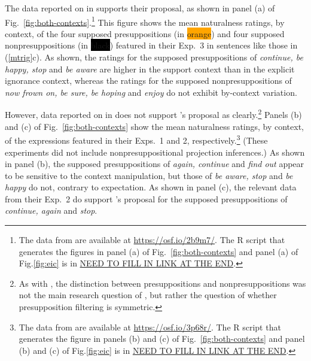 \documentclass[11pt,fleqn]{article}
\newcommand{\6}{\mbox{$[\hspace*{-.6mm}[$}}
\newcommand{\9}{\mbox{$]\hspace*{-.6mm}]$}}
\newcommand{\citepos}[1]{\citeauthor{#1}'s \citeyear{#1}}
\begin{document}
The data reported on in \citealt[Exp.~3]{mandelkern-etal2020} supports their proposal, as shown in panel (a) of Fig.~\ref{fig:both-contexts}.\footnote{The data from \citealt[Exp.~3]{mandelkern-etal2020} are available at \url{https://osf.io/2b9m7/}. The R script that generates the figures in panel (a) of Fig.~\ref{fig:both-contexts} and panel (a) of Fig.\ref{fig:eic} is in \url{NEED TO FILL IN LINK AT THE END}.} This figure shows the mean naturalness ratings, by context, of the four supposed presuppositions   (in \colorbox{orange}{\color{white}orange\color{black}}) and four supposed nonpresuppositions  (in \colorbox{black}{\color{white}black\color{black}}) featured in their Exp.~3 in sentences like those in (\ref{mtrig}c). As shown, the ratings for the supposed presuppositions of \emph{continue, be happy, stop} and \emph{be aware} are higher in the support context than in the explicit ignorance context, whereas the ratings for the supposed nonpresuppositions of \emph{now frown on, be sure, be hoping} and \emph{enjoy} do not exhibit by-context variation. %

However, data reported on in \citealt{kalomoiros-schwarz2024} does not support \citepos{mandelkern-etal2020} proposal as clearly.\footnote{As with \citealt{mandelkern-etal2020}, the distinction between presuppositions and nonpresuppositions was not the main research question of \citealt{kalomoiros-schwarz2024}, but rather the question of whether presupposition filtering is symmetric.} Panels (b) and (c) of Fig.~\ref{fig:both-contexts} show the mean naturalness ratings, by context, of the expressions featured in their Exps.~1 and 2, respectively.\footnote{The data from \citealt{kalomoiros-schwarz2024} are available at \url{https://osf.io/3p68r/}. The R script that generates the figure in panels (b) and (c) of Fig.~\ref{fig:both-contexts} and panel (b) and (c) of Fig.\ref{fig:eic} is in \url{NEED TO FILL IN LINK AT THE END}.} (These experiments did not include nonpresuppositional projection inferences.) As shown in panel (b), the supposed presuppositions of \emph{again, continue} and \emph{find out} appear to be sensitive to the context manipulation, but those of \emph{be aware, stop} and \emph{be happy} do not, contrary to expectation. As shown in panel (c), the relevant data from their Exp.~2 do support \citepos{mandelkern-etal2020} proposal for the supposed presuppositions of \emph{continue, again} and \emph{stop}. 
\end{document}
